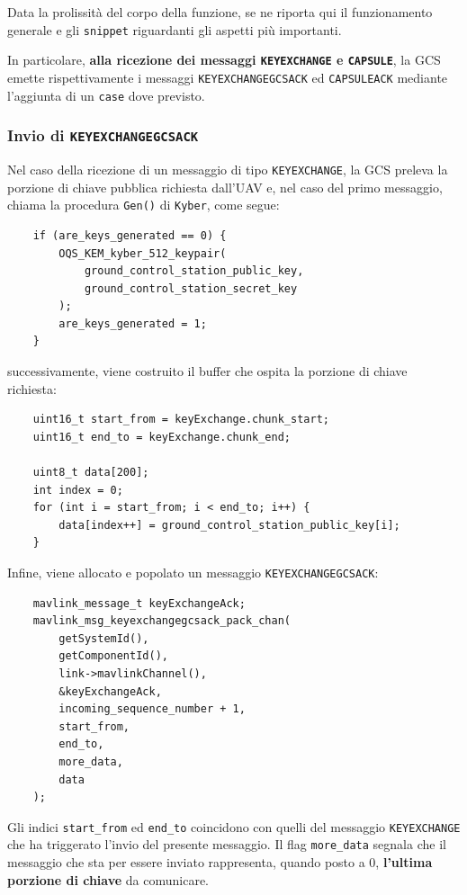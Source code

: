 \documentclass[a4paper, 12pt, oneside]{article}
\theoremstyle{definition}
\begin{document}
Data la prolissità del corpo della funzione, se ne riporta qui il funzionamento generale e gli \texttt{snippet} riguardanti gli aspetti più importanti.

In particolare, \textbf{alla ricezione dei messaggi \texttt{KEYEXCHANGE} e \texttt{CAPSULE}}, la GCS emette rispettivamente i messaggi \texttt{KEYEXCHANGEGCSACK} ed \texttt{CAPSULEACK} mediante l'aggiunta di un \texttt{case} dove previsto.


\subsubsection{Invio di \texttt{KEYEXCHANGEGCSACK}}
Nel caso della ricezione di un messaggio di tipo \texttt{KEYEXCHANGE}, la GCS preleva la porzione di chiave pubblica richiesta dall'UAV e, nel caso del primo messaggio, chiama la procedura \texttt{Gen()} di \texttt{Kyber}, come segue:

\begin{verbatim}
    if (are_keys_generated == 0) {
        OQS_KEM_kyber_512_keypair(
            ground_control_station_public_key,
            ground_control_station_secret_key
        );
        are_keys_generated = 1;
    }
\end{verbatim}

successivamente, viene costruito il buffer che ospita la porzione di chiave richiesta:

\begin{verbatim}
    uint16_t start_from = keyExchange.chunk_start;
    uint16_t end_to = keyExchange.chunk_end;

    uint8_t data[200];
    int index = 0;
    for (int i = start_from; i < end_to; i++) {
        data[index++] = ground_control_station_public_key[i];
    }
\end{verbatim}

Infine, viene allocato e popolato un messaggio \texttt{KEYEXCHANGEGCSACK}:

\begin{verbatim}
    mavlink_message_t keyExchangeAck;
    mavlink_msg_keyexchangegcsack_pack_chan(
        getSystemId(),
        getComponentId(),
        link->mavlinkChannel(),
        &keyExchangeAck,
        incoming_sequence_number + 1,
        start_from,
        end_to,
        more_data,
        data
    );
\end{verbatim}

Gli indici \texttt{start\_from} ed \texttt{end\_to} coincidono con quelli del messaggio \texttt{KEYEXCHANGE} che ha triggerato l'invio del presente messaggio. Il flag \texttt{more\_data} segnala che il messaggio che sta per essere inviato rappresenta, quando posto a 0, \textbf{l'ultima porzione di chiave} da comunicare. 
\end{document}
